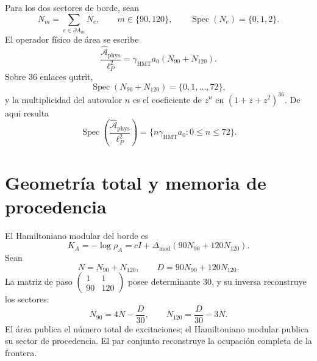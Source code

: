 Para los dos sectores de borde, sean
\begin{equation}
 N_m=\sum_{e\in\partial A_m}N_e,
 \qquad m\in\{90,120\},
 \qquad \operatorname{Spec}(N_e)=\{0,1,2\}.
 \label{eq:l9s102:n90-n120}
\end{equation}
El operador físico de área se escribe
\begin{equation}
 \boxed{
 \frac{\widehat{\mathcal A}_{\mathrm{phys}}}{\ell_P^2}
 =\gamma_{\mathrm{HMT}}a_0(N_{90}+N_{120}).}
 \label{eq:l9s102:area-operador}
\end{equation}
Sobre \(36\) enlaces qutrit,
\begin{equation}
 \operatorname{Spec}(N_{90}+N_{120})=\{0,1,\ldots,72\},
 \label{eq:l9s102:area-numero-spectrum}
\end{equation}
y la multiplicidad del autovalor \(n\) es el coeficiente de \(z^n\) en
\((1+z+z^2)^{36}\). De aqui resulta
\begin{equation}
 \operatorname{Spec}\!\left(
 \frac{\widehat{\mathcal A}_{\mathrm{phys}}}{\ell_P^2}\right)
 =\{n\gamma_{\mathrm{HMT}}a_0:0\le n\le72\}.
 \label{eq:l9s102:area-spectrum}
\end{equation}

\section{Geometría total y memoria de procedencia}
\label{sec:l9s102:area-hamiltoniano}

El Hamiltoniano modular del borde es
\begin{equation}
 \boxed{
 K_A=-\log\rho_A
 =cI+\Delta_{\mathrm{mod}}(90N_{90}+120N_{120}).}
 \label{eq:l9s102:hamiltoniano-modular}
\end{equation}
Sean
\begin{equation}
 N=N_{90}+N_{120},
 \qquad
 D=90N_{90}+120N_{120}.
 \label{eq:l9s102:n-d}
\end{equation}
La matriz de paso
\(\left(\begin{smallmatrix}1&1\\90&120\end{smallmatrix}\right)\)
posee determinante \(30\), y su inversa reconstruye los sectores:
\begin{equation}
 \boxed{
 N_{90}=4N-\frac{D}{30},
 \qquad
 N_{120}=\frac{D}{30}-3N.}
 \label{eq:l9s102:reconstruccion-sectores}
\end{equation}
El área publica el número total de excitaciones; el Hamiltoniano modular
publica su sector de procedencia. El par conjunto reconstruye la ocupación
completa de la frontera.

